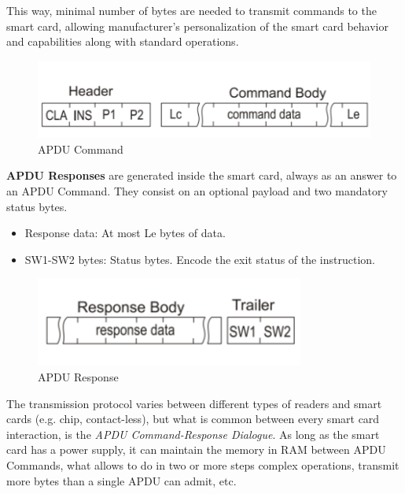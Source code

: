 This way, minimal number of bytes are needed to transmit commands to the smart card, allowing manufacturer's personalization of the smart card behavior and capabilities along with standard operations.

\begin{figure}[bth]
	\begin{center}
		\includegraphics[width=0.55\linewidth]{gfx/APDUCommand}
	\end{center}
	\caption{APDU Command}
	\label{fig:APDUCommand}
\end{figure}


\textbf{APDU Responses} are generated inside the smart card, always as an answer to an APDU Command. They consist on an optional payload and two mandatory status bytes.


\begin{itemize}
	\item Response data: At most Le bytes of data.
	\item SW1-SW2 bytes: Status bytes. Encode the exit status of the instruction.
\end{itemize}

\begin{figure}[bth]
	\begin{center}
		\includegraphics[width=0.55\linewidth]{gfx/APDUResponse}
	\end{center}
	\caption{APDU Response}
	\label{fig:APDUResponse}
\end{figure}




\hfil


The transmission protocol varies between different types of readers and smart cards (e.g. chip, contact-less), but what is common between every smart card interaction, is the \textit{APDU Command-Response Dialogue}. As long as the smart card has a power supply, it can maintain the memory in RAM between APDU Commands, what allows to do in two or more steps complex operations, transmit more bytes than a single APDU can admit, etc.

